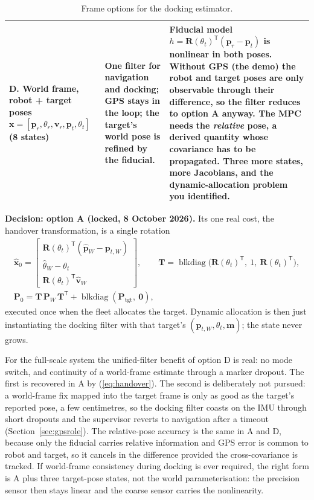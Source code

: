 \documentclass[11pt,a4paper]{article}
\newcommand{\vect}[1]{\bm{#1}}
\newcommand{\mat}[1]{\bm{#1}}
\newcommand{\T}{^{\mathsf{T}}}
\DeclareMathOperator{\blkdiag}{blkdiag}
\newcommand{\Rot}{\mat{R}}
\newcommand{\hx}{\hat{\vect{x}}}
\begin{document}
\begin{table}[H]
\begin{tabularx}{\linewidth}{>{\raggedright\arraybackslash}p{2.7cm} X X}
\midrule
\textbf{D. World frame, robot + target poses} \newline
$\vect{x}=[\vect{p}_r,\theta_r,\vect v_r,\vect{p}_t,\theta_t]$ (8 states) &
One filter for navigation and docking; GPS stays in the loop; the target's world pose is refined by the fiducial. &
Fiducial model $h=\Rot(\theta_t)\T(\vect p_r-\vect p_t)$ is nonlinear in both poses. Without GPS (the demo) the robot and target poses are only observable through their difference, so the filter reduces to option A anyway. The MPC needs the \emph{relative} pose, a derived quantity whose covariance has to be propagated. Three more states, more Jacobians, and the dynamic-allocation problem you identified. \\
\bottomrule
\end{tabularx}
\caption{Frame options for the docking estimator.}
\end{table}

\noindent\textbf{Decision: option A (locked, 8 October 2026).} Its one real cost, the handover transformation, is a single rotation
\begin{gather}
\hx_0 = \begin{bmatrix}\Rot(\theta_t)\T(\hat{\vect p}_W-\vect p_{t,W}) \\ \hat\theta_W-\theta_t \\ \Rot(\theta_t)\T\hat{\vect v}_W\end{bmatrix},
\qquad
\mat T=\blkdiag\!\big(\Rot(\theta_t)\T,\ 1,\ \Rot(\theta_t)\T\big),
\label{eq:handover}\\
\mat P_0 = \mat T\,\mat P_W\,\mat T\T + \blkdiag(\mat P_{\mathrm{tgt}},\ \mat 0),
\end{gather}
executed once when the fleet allocates the target. Dynamic allocation is then just instantiating the docking filter with that target's $(\vect p_{t,W},\theta_t,\vect m)$; the state never grows.

For the full-scale system the unified-filter benefit of option D is real: no mode switch, and continuity of a world-frame estimate through a marker dropout. The first is recovered in A by (\ref{eq:handover}). The second is deliberately not pursued: a world-frame fix mapped into the target frame is only as good as the target's reported pose, a few centimetres, so the docking filter coasts on the IMU through short dropouts and the supervisor reverts to navigation after a timeout (Section~\ref{sec:gpsrole}). The relative-pose accuracy is the same in A and D, because only the fiducial carries relative information and GPS error is common to robot and target, so it cancels in the difference provided the cross-covariance is tracked. If world-frame consistency during docking is ever required, the right form is A plus three target-pose states, not the world parameterisation: the precision sensor then stays linear and the coarse sensor carries the nonlinearity.
\end{document}
